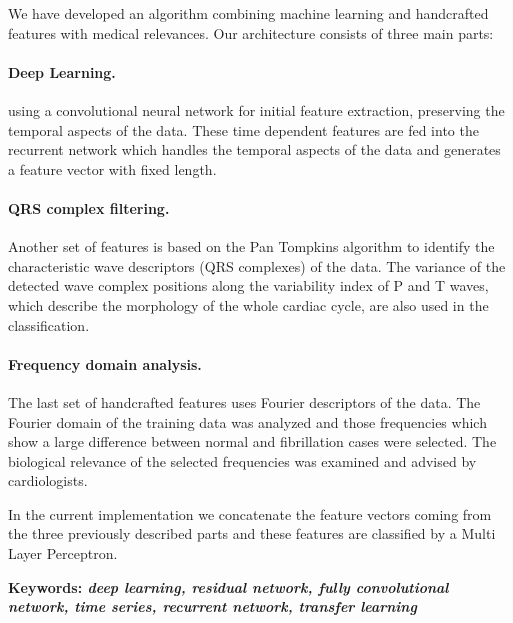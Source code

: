 We have developed an algorithm combining machine learning and handcrafted
features with medical relevances.
Our architecture consists of three main parts:

\paragraph{Deep Learning.} using a
convolutional neural network for initial feature extraction, preserving the
temporal aspects of the data. These time dependent features are fed into
the recurrent network which handles the temporal aspects of the data and
generates a feature vector with fixed length.

\paragraph{QRS complex filtering.}
Another set of features is based on the Pan Tompkins algorithm to identify the
characteristic wave descriptors (QRS complexes) of the data.
The variance of the detected wave complex positions along the variability index of P and T waves, which describe the morphology of the whole cardiac cycle, are also used in the classification.

\paragraph{Frequency domain analysis.} The last set of handcrafted features uses Fourier descriptors of the data.
The Fourier domain of the training data was analyzed and those frequencies which
show a large difference between normal and fibrillation cases were selected. The
biological relevance of the selected frequencies was examined and advised by
cardiologists.

In the current implementation we concatenate the feature vectors coming from the
three previously described parts and these features are classified by a Multi Layer Perceptron.

\textbf{Keywords: \textit{deep learning, residual network, fully convolutional network, time series, recurrent network, transfer learning}}
